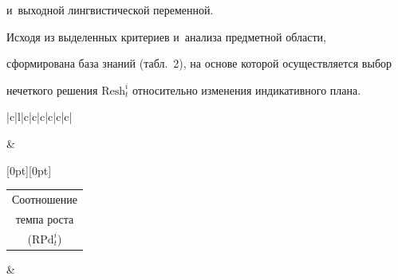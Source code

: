 и~выходной лингвистической переменной. 


  


  Исходя из выделенных критериев и~анализа предметной об\-ласти, 


сформирована база знаний (табл.~2), на основе которой осуществляется выбор 


нечеткого решения $\mathrm{Resh}_t^i$ относительно изменения индикативного плана. 


  


    \begin{table}\small %




  \begin{center}




   \vspace*{2ex}


   


   \tabcolsep=5.5pt


   \begin{tabular}{|c|l|c|c|c|c|c|c|}


   \hline


   &




{\raisebox{-24pt}[0pt][0pt]{\tabcolsep=0pt\begin{tabular}{c}


Соотношение\\ темпа роста\\


($\mathrm{RPd}_t^i$)\end{tabular}}}&\\





\end{tabular}
\end{center}
\end{table}
